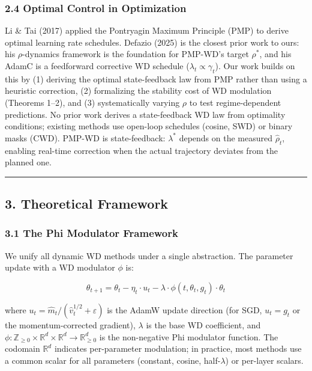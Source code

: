 \documentclass[
]{article}
\begin{document}
\hypertarget{optimal-control-in-optimization}{%
\subsubsection{2.4 Optimal Control in
Optimization}\label{optimal-control-in-optimization}}

Li \& Tai (2017) applied the Pontryagin Maximum Principle (PMP) to
derive optimal learning rate schedules. Defazio (2025) is the closest
prior work to ours: his \(\rho\)-dynamics framework is the foundation
for PMP-WD's target \(\rho^*\), and his AdamC is a feedforward
corrective WD schedule (\(\lambda_t \propto \gamma_t\)). Our work builds
on this by (1) deriving the optimal state-feedback law from PMP rather
than using a heuristic correction, (2) formalizing the stability cost of
WD modulation (Theorems 1--2), and (3) systematically varying \(\rho\)
to test regime-dependent predictions. No prior work derives a
state-feedback WD law from optimality conditions; existing methods use
open-loop schedules (cosine, SWD) or binary masks (CWD). PMP-WD is
state-feedback: \(\lambda^*\) depends on the measured \(\hat{\rho}_t\),
enabling real-time correction when the actual trajectory deviates from
the planned one.

\begin{center}\rule{0.5\linewidth}{0.5pt}\end{center}

\hypertarget{theoretical-framework}{%
\subsection{3. Theoretical Framework}\label{theoretical-framework}}

\hypertarget{the-phi-modulator-framework}{%
\subsubsection{3.1 The Phi Modulator
Framework}\label{the-phi-modulator-framework}}

We unify all dynamic WD methods under a single abstraction. The
parameter update with a WD modulator \(\phi\) is:

\[\theta_{t+1} = \theta_t - \eta_t \cdot u_t - \lambda \cdot \phi(t, \theta_t, g_t) \cdot \theta_t\]

where \(u_t = \hat{m}_t / (\hat{v}_t^{1/2} + \varepsilon)\) is the AdamW
update direction (for SGD, \(u_t = g_t\) or the momentum-corrected
gradient), \(\lambda\) is the base WD coefficient, and
\(\phi : \mathbb{Z}_{\geq 0} \times \mathbb{R}^d \times \mathbb{R}^d \to \mathbb{R}^d_{\geq 0}\)
is the non-negative Phi modulator function. The codomain
\(\mathbb{R}^d\) indicates per-parameter modulation; in practice, most
methods use a common scalar for all parameters (constant, cosine,
half-\(\lambda\)) or per-layer scalars.
\end{document}
